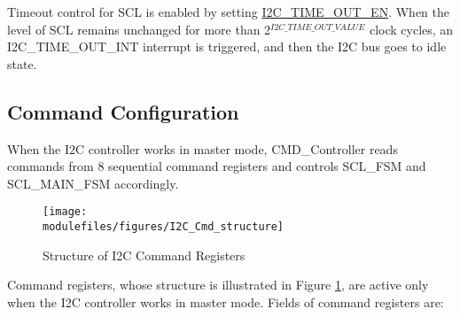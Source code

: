 \documentclass[main\_\_EN.tex]{subfiles}
\begin{document}
Timeout control for SCL is enabled by setting \hyperref[fielddesc:I2CTIMEOUTEN]{I2C\_TIME\_OUT\_EN}. When the level of SCL remains unchanged for more than 2$^{\hyperref[fielddesc:I2CTIMEOUTVALUE]{I2C\_TIME\_OUT\_VALUE}}$ clock cycles, an I2C\_TIME\_OUT\_INT interrupt is triggered, and then the I2C bus goes to idle state.

\subsection{Command Configuration}\label{sec:i2c-func-descr-cmd-controller}
When the I2C controller works in master mode, CMD\_Controller reads commands from 8 sequential command registers and controls SCL\_FSM and SCL\_MAIN\_FSM accordingly.

\begin{figure}[H]
    \centering
    \texttt{[image: \\modulefiles/figures/I2C\_Cmd\_structure]}
    \caption{Structure of I2C Command Registers}
    \label{fig:i2c-cmd-structure}
\end{figure}

Command registers, whose structure is illustrated in Figure \ref{fig:i2c-cmd-structure}, are active only when the I2C controller works in master mode. Fields of command registers are:
\end{document}
